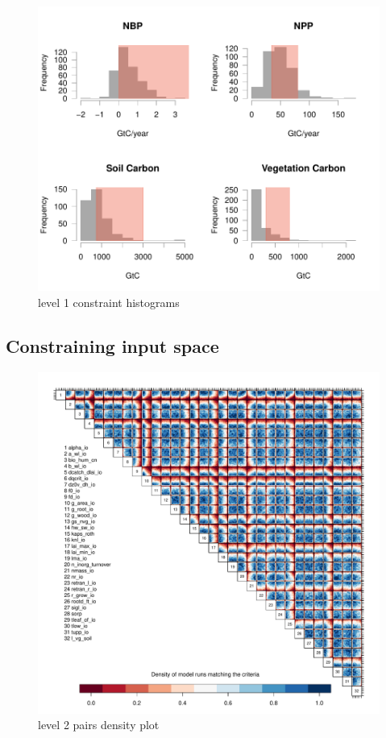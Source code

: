 \documentclass[gmd, manuscript]{copernicus}
\begin{document}
\begin{figure}[t]
\includegraphics[width=12cm]{./graphics/level_2_constraints_hists.pdf}
\caption{level 1 constraint histograms}
\label{fig:level_2_constraints_hists}
\end{figure}


\subsection{Constraining input space}




\begin{figure}[t]
\includegraphics[width=12cm]{./graphics/pairs_dens_level2_km.pdf}
\caption{level 2 pairs density plot}
\label{fig:pairs_dens_level1a_km}
\end{figure}
\end{document}
